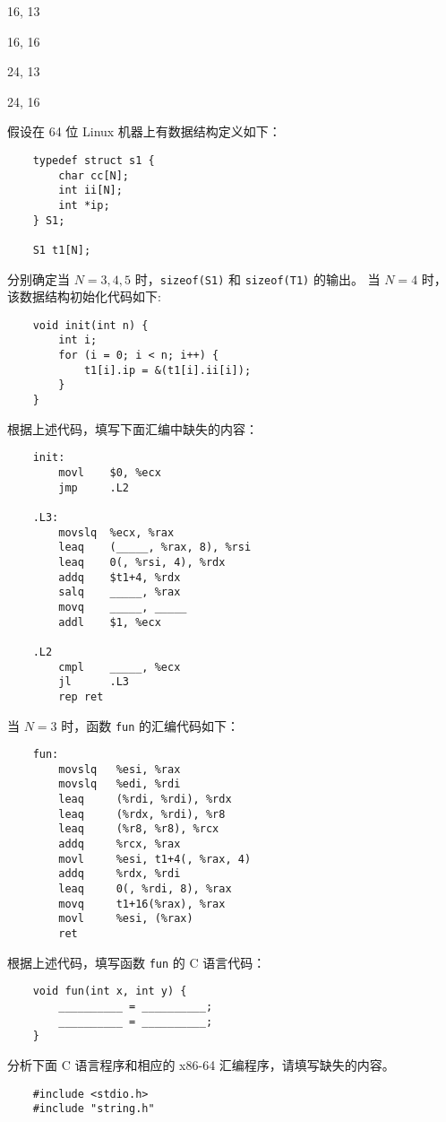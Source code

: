 \begin{problems}
        \begin{choices}
            \item 16, 13
            \item 16, 16
            \item 24, 13
            \item 24, 16
        \end{choices}
         假设在 64 位 Linux 机器上有数据结构定义如下：
        \begin{verbatim}
    typedef struct s1 {
        char cc[N];
        int ii[N];
        int *ip;
    } S1;
    
    S1 t1[N];
        \end{verbatim}
        \qn 分别确定当 $N=3, 4, 5$ 时，\verb|sizeof(S1)| 和 \verb|sizeof(T1)| 的输出。
        \qn 当 $N=4$ 时，该数据结构初始化代码如下: 
        \begin{verbatim}
    void init(int n) {
        int i;
        for (i = 0; i < n; i++) {
            t1[i].ip = &(t1[i].ii[i]);
        }
    }
        \end{verbatim}
        根据上述代码，填写下面汇编中缺失的内容：
        \begin{verbatim}
    init:
        movl    $0, %ecx
        jmp     .L2

    .L3:
        movslq  %ecx, %rax
        leaq    (_____, %rax, 8), %rsi
        leaq    0(, %rsi, 4), %rdx
        addq    $t1+4, %rdx
        salq    _____, %rax
        movq    _____, _____
        addl    $1, %ecx

    .L2
        cmpl    _____, %ecx
        jl      .L3
        rep ret
        \end{verbatim}
        \qn 当 $N=3$ 时，函数 \verb|fun| 的汇编代码如下：
        \begin{verbatim}
    fun:
        movslq   %esi, %rax
        movslq   %edi, %rdi
        leaq     (%rdi, %rdi), %rdx
        leaq     (%rdx, %rdi), %r8
        leaq     (%r8, %r8), %rcx
        addq     %rcx, %rax
        movl     %esi, t1+4(, %rax, 4)
        addq     %rdx, %rdi
        leaq     0(, %rdi, 8), %rax
        movq     t1+16(%rax), %rax
        movl     %esi, (%rax)
        ret
        \end{verbatim}
        根据上述代码，填写函数 \verb|fun| 的 C 语言代码：
        \begin{verbatim}
    void fun(int x, int y) {
        __________ = __________;
        __________ = __________;
    }
        \end{verbatim}
         分析下面 C 语言程序和相应的 x86-64 汇编程序，请填写缺失的内容。
        \begin{verbatim}
    #include <stdio.h>
    #include "string.h"


\end{verbatim}
\end{problems}
